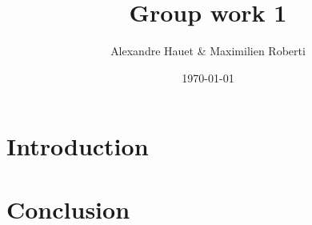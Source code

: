 \documentclass{article}
\title{Group work 1}
\author{Alexandre Hauet \& Maximilien Roberti}
\date{\today}
\begin{document}
\maketitle

\section{Introduction}

\section{Conclusion}
\end{document}

